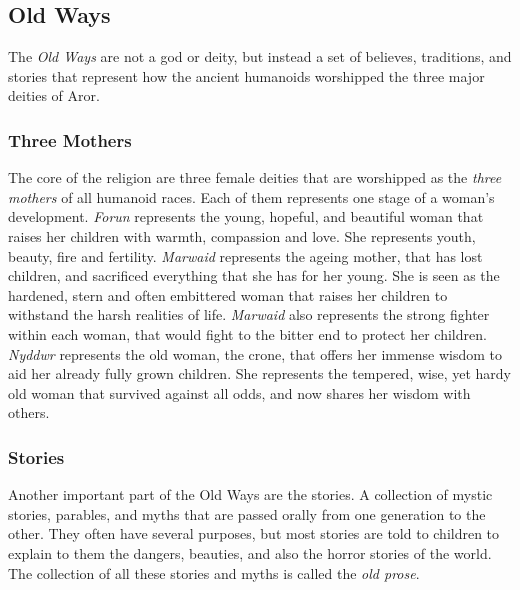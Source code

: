 \subsection{Old Ways}
\label{sec:Old Ways}

The \emph{Old Ways} are not a god or deity, but instead a set of believes,
traditions, and stories that represent how the ancient humanoids worshipped
the three major deities of Aror.

\subsubsection*{Three Mothers}

The core of the religion are three female deities that are worshipped as the
\emph{three mothers} of all humanoid races. Each of them represents one stage
of a woman's development. \emph{Forun} represents the young, hopeful, and
beautiful woman that raises her children with warmth, compassion and love. She
represents youth, beauty, fire and fertility. \emph{Marwaid} represents the
ageing mother, that has lost children, and sacrificed everything that she has
for her young. She is seen as the hardened, stern and often embittered woman
that raises her children to withstand the harsh realities of life.
\emph{Marwaid} also represents the strong fighter within each woman, that
would fight to the bitter end to protect her children. \emph{Nyddwr} represents
the old woman, the crone, that offers her immense wisdom to aid her already
fully grown children. She represents the tempered, wise, yet hardy old woman
that survived against all odds, and now shares her wisdom with others.

\subsubsection*{Stories}



Another important part of the Old Ways are the stories. A collection of mystic
stories, parables, and myths that are passed orally from one generation to the
other. They often have several purposes, but most stories are told to children
to explain to them the dangers, beauties, and also the horror stories of the
world. The collection of all these stories and myths is called the
\emph{old prose}.

